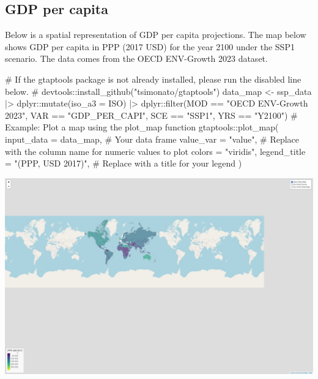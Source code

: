 \documentclass[
  letterpaper,
  DIV=11,
  numbers=noendperiod]{scrartcl}
\newenvironment{Shaded}{}{}
\newcommand{\AttributeTok}[1]{\textcolor[rgb]{0.00,0.34,0.68}{#1}}
\newcommand{\CommentTok}[1]{\textcolor[rgb]{0.54,0.53,0.53}{#1}}
\newcommand{\FunctionTok}[1]{\textcolor[rgb]{0.39,0.29,0.61}{#1}}
\newcommand{\NormalTok}[1]{\textcolor[rgb]{0.12,0.11,0.11}{#1}}
\newcommand{\OtherTok}[1]{\textcolor[rgb]{0.00,0.43,0.16}{#1}}
\newcommand{\SpecialCharTok}[1]{\textcolor[rgb]{0.24,0.68,0.91}{#1}}
\newcommand{\StringTok}[1]{\textcolor[rgb]{0.75,0.01,0.01}{#1}}
\begin{document}
\subsection{GDP per capita}

Below is a spatial representation of GDP per capita projections. The map
below shows GDP per capita in PPP (2017 USD) for the year 2100 under the
SSP1 scenario. The data comes from the OECD ENV-Growth 2023 dataset.

\begin{Shaded}
\begin{Highlighting}[]
\CommentTok{\# If the gtaptools package is not already installed, please run the disabled line below.}
\CommentTok{\# devtools::install\_github("tsimonato/gtaptools")}
\NormalTok{data\_map  }\OtherTok{\textless{}{-}}\NormalTok{ ssp\_data }\SpecialCharTok{|\textgreater{}} 
\NormalTok{  dplyr}\SpecialCharTok{::}\FunctionTok{mutate}\NormalTok{(}\AttributeTok{iso\_a3 =}\NormalTok{ ISO) }\SpecialCharTok{|\textgreater{}} 
\NormalTok{  dplyr}\SpecialCharTok{::}\FunctionTok{filter}\NormalTok{(MOD }\SpecialCharTok{==} \StringTok{"OECD ENV{-}Growth 2023"}\NormalTok{,}
\NormalTok{                VAR }\SpecialCharTok{==} \StringTok{"GDP\_PER\_CAPI"}\NormalTok{,}
\NormalTok{                SCE }\SpecialCharTok{==} \StringTok{"SSP1"}\NormalTok{,}
\NormalTok{                YRS }\SpecialCharTok{==} \StringTok{"Y2100"}\NormalTok{)}
\CommentTok{\# Example: Plot a map using the \textasciigrave{}plot\_map\textasciigrave{} function}
\NormalTok{gtaptools}\SpecialCharTok{::}\FunctionTok{plot\_map}\NormalTok{(}
  \AttributeTok{input\_data =}\NormalTok{ data\_map,       }\CommentTok{\# Your data frame}
  \AttributeTok{value\_var =} \StringTok{"value"}\NormalTok{,    }\CommentTok{\# Replace with the column name for numeric values to plot}
  \AttributeTok{colors =} \StringTok{"viridis"}\NormalTok{,}
  \AttributeTok{legend\_title =} \StringTok{"(PPP, USD 2017)"}\NormalTok{,        }\CommentTok{\# Replace with a title for your legend}
\NormalTok{)}
\end{Highlighting}
\end{Shaded}

\includegraphics{index_files/figure-pdf/unnamed-chunk-7-1.pdf}
\end{document}
